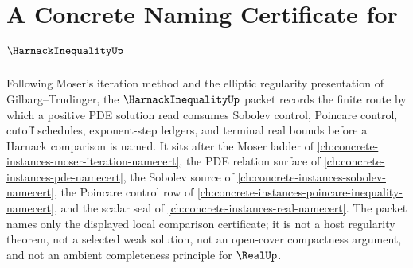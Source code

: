 \chapter{A Concrete Naming Certificate for $\HarnackInequalityUp$}
\label{ch:concrete-instances-harnack-inequality-namecert}

Following Moser's iteration method and the elliptic regularity presentation of Gilbarg--Trudinger, the $\HarnackInequalityUp$ packet records the finite route by which a positive PDE solution read consumes Sobolev control, Poincare control, cutoff schedules, exponent-step ledgers, and terminal real bounds before a Harnack comparison is named. It sits after the Moser ladder of \autoref{ch:concrete-instances-moser-iteration-namecert}, the PDE relation surface of \autoref{ch:concrete-instances-pde-namecert}, the Sobolev source of \autoref{ch:concrete-instances-sobolev-namecert}, the Poincare control row of \autoref{ch:concrete-instances-poincare-inequality-namecert}, and the scalar seal of \autoref{ch:concrete-instances-real-namecert}. The packet names only the displayed local comparison certificate; it is not a host regularity theorem, not a selected weak solution, not an open-cover compactness argument, and not an ambient completeness principle for $\RealUp$.

